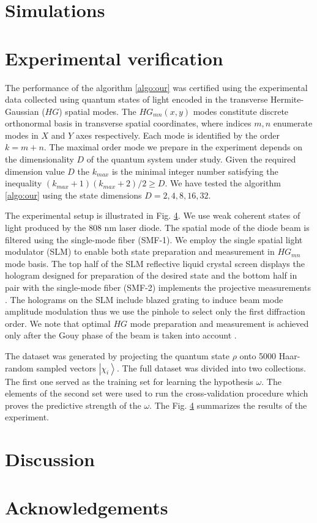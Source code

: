 \documentclass[%
 reprint,
 amsmath,amssymb,
 aps,
]{revtex4-2}
\begin{document}
\section{\label{sec:sim}Simulations}

\section{\label{sec:exp}Experimental verification}
The performance of the algorithm \ref{algo:our} was certified using the experimental data collected using quantum states of light encoded in the transverse Hermite-Gaussian ($HG$) spatial modes. The $HG_{mn}(x,y)$ modes constitute discrete orthonormal basis in transverse spatial coordinates, where indices $m,n$ enumerate modes in $X$ and $Y$ axes respectively. Each mode is identified by the order $k = m+n$. The maximal order mode we prepare in the experiment depends on the dimensionality $D$ of the quantum system under study. Given the required dimension value $D$ the $k_{max}$ is the minimal integer number satisfying the inequality $(k_{max}+1)(k_{max}+2)/2 \geq D$. We have tested the algorithm \ref{algo:our} using the state dimensions $D =2,4,8,16,32$.

The experimental setup is illustrated in Fig. \ref{}. We use weak coherent states of light produced by the 808 nm laser diode. The spatial mode of the diode beam is filtered using the single-mode fiber (SMF-1). We employ the single spatial light modulator (SLM) to enable both state preparation and measurement in $HG_{mn}$ mode basis. The top half of the SLM reflective liquid crystal screen displays the hologram designed for preparation of the desired state and the bottom half in pair with the single-mode fiber (SMF-2) implements the projective measurements \cite{Bent2015, Palmieri2020}. The holograms on the SLM include blazed grating to induce beam mode amplitude modulation \cite{Bolduc2013} thus we use the pinhole to select only the first diffraction order. We note that optimal $HG$ mode preparation and measurement is achieved only after the Gouy phase of the beam is taken into account \cite{Struchalin2020}.

The dataset was generated by projecting the quantum state $\rho$ onto 5000 Haar-random sampled vectors $\left|\chi_{i}\right\rangle$. The full dataset was divided into two collections. The first one served as the training set for learning the hypothesis $\omega$. The elements of the second set were used to run the cross-validation procedure which proves the predictive strength of the $\omega$. The Fig. \ref{} summarizes the results of the experiment. 

\section{\label{sec:discuss}Discussion}

\section{\label{sec:acknowledge}Acknowledgements}

\end{document}
